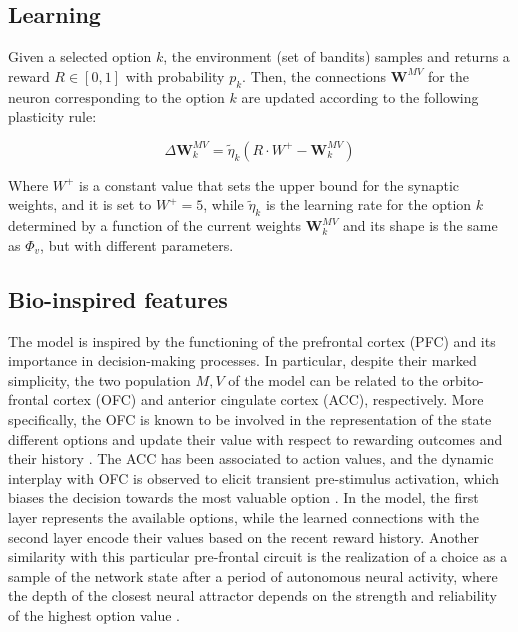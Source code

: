 \subsection{Learning}
Given a selected option $k$, the environment (set of bandits) samples and returns a reward $R\in [0, 1]$ with probability $p_{k}$.
Then, the connections $\textbf{W}^{MV}$ for the neuron corresponding to the option $k$ are updated according to the following plasticity rule:

\begin{equation}
    \Delta \textbf{W}^{MV}_{k} = \tilde{\eta}_{k} \left(R\cdot W^{+}- \textbf{W}^{MV}_{k}\right)
\end{equation}

\noindent
Where $W^{+}$ is a constant value that sets the upper bound for the synaptic weights, and it is set to $W^{+} = 5$, while $\tilde{\eta}_{k}$ is the learning rate for the option $k$ determined by a function of the current weights $\textbf{W}^{MV}_{k}$ and its shape is the same as $\Phi_{v}$, but with
different parameters.


\subsection{Bio-inspired features}

The model is inspired by the functioning of the prefrontal cortex (PFC) and its importance in decision-making processes. In particular, despite their marked simplicity, the two population $M, V$ of the model can be related to the orbito-frontal cortex (OFC) and anterior cingulate cortex (ACC), respectively.
More specifically, the OFC is known to be involved in the representation of the state different options and update their value with respect to rewarding outcomes and their history \cite{lukChoiceCodingFrontal2013, kennerleyDecisionMakingReward2011a}. The ACC has been associated to action values, and the dynamic interplay with OFC is observed to elicit
transient pre-stimulus activation, which biases the decision towards the most valuable option \cite{funahashiPrefrontalContributionDecisionMaking2017, marcosDeterminingMonkeyFree2016, balewskiValueDynamicsAffect2023}. In the model, the first layer represents the available options, while the learned
connections with the second layer encode their values based on the recent reward history. Another similarity with this particular pre-frontal circuit is the realization of a choice as a sample of the network state after a period of autonomous neural activity, where the depth of the closest
neural attractor depends on the strength and reliability of the highest option value \cite{backmanEffectsWorkingMemoryTraining2011, enelStableDynamicRepresentations2020}.

